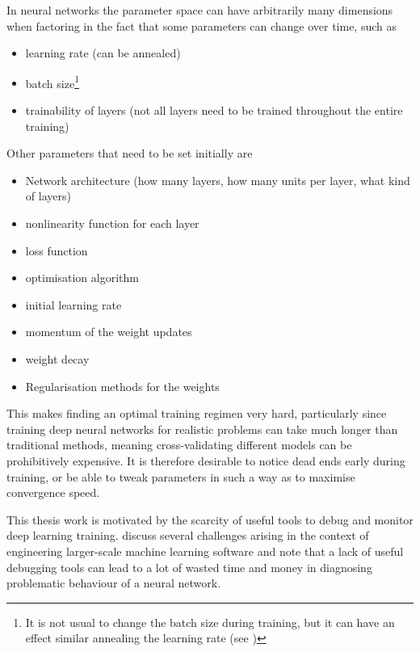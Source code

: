In neural networks the parameter space can have arbitrarily many dimensions when
factoring in the fact that some parameters can change over time, such as

\begin{itemize}
    \item
        learning rate (can be annealed)
    \item
        batch size\footnote{It is not usual to change the batch size during
            training, but it can have an effect similar annealing the learning
        rate (see \cite{DBLP:journals/corr/abs-1711-00489})}
    \item
        trainability of layers (not all layers need to be trained throughout the
        entire training)
\end{itemize}

Other parameters that need to be set initially are

\begin{itemize}
    \item
        Network architecture (how many layers, how many units per layer,
        what kind of layers)
    \item
        nonlinearity function for each layer
    \item
        loss function
    \item
        optimisation algorithm
    \item
        initial learning rate
    \item
        momentum of the weight updates
    \item
        weight decay
    \item
        Regularisation methods for the weights
\end{itemize}

This makes finding an optimal training regimen very hard, particularly since
training deep neural networks for realistic problems can take much longer than
traditional methods, meaning cross-validating different models can be
prohibitively expensive. It is therefore desirable to notice dead ends early
during training, or be able to tweak parameters in such a way as to maximise
convergence speed.

This thesis work is motivated by the scarcity of useful tools to debug and
monitor deep learning training. \citet{arpteg2018software} discuss several
challenges arising in the context of engineering larger-scale machine learning
software and note that a lack of useful debugging tools can lead to a lot of
wasted time and money in diagnosing problematic behaviour of a neural network.

